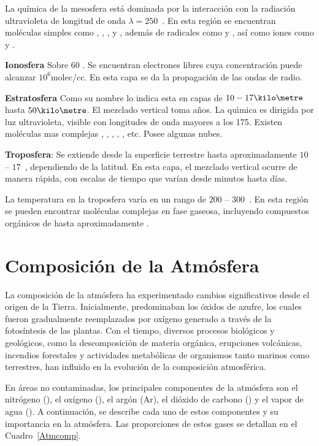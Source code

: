 La química de la mesosfera está dominada por la interacción con la radiación ultravioleta de longitud de onda $\lambda = 250$~\nano\metre. En esta región se encuentran moléculas simples como , , ,  y , además de radicales como  y , así como iones como  y .
 

 \textbf{Ionosfera} Sobre 60 \kilo\metre. Se encuentran electrones libres cuya concentraci\'on puede alcanzar $10^6$molec/cc. En esta capa se da la propagaci\'on de las ondas de radio.
 
 \textbf{Estratosfera} Como su nombre lo indica esta en capas de $10-17 \kilo\metre$ hasta $50\kilo\metre$. El mezclado vertical toma a\~nos. La qu\'{\i}mica es dirigida por luz ultravioleta, visible con longitudes de onda mayores a los 175\nano\metre. Existen mol\'eculas mas complejas , , , , , etc. Posee algunas nubes.
 
\textbf{Troposfera}: Se extiende desde la superficie terrestre hasta aproximadamente $10$ -- $17$~\kilo\metre, dependiendo de la latitud. En esta capa, el mezclado vertical ocurre de manera rápida, con escalas de tiempo que varían desde minutos hasta días.  

La temperatura en la troposfera varía en un rango de $200$ -- $300$~\kelvin. En esta región se pueden encontrar moléculas complejas en fase gaseosa, incluyendo compuestos orgánicos de hasta aproximadamente .

  \section{Composición de la Atmósfera}
   \label{catmos}

La composición de la atmósfera ha experimentado cambios significativos desde el origen de la Tierra. Inicialmente, predominaban los óxidos de azufre, los cuales fueron gradualmente reemplazados por oxígeno generado a través de la fotosíntesis de las plantas. Con el tiempo, diversos procesos biológicos y geológicos, como la descomposición de materia orgánica, erupciones volcánicas, incendios forestales y actividades metabólicas de organismos tanto marinos como terrestres, han influido en la evolución de la composición atmosférica.

En áreas no contaminadas, los principales componentes de la atmósfera son el nitrógeno (), el oxígeno (), el argón (Ar), el dióxido de carbono () y el vapor de agua (). A continuación, se describe cada uno de estos componentes y su importancia en la atmósfera. Las proporciones de estos gases se detallan en el Cuadro~\ref{Atmcomp}.


